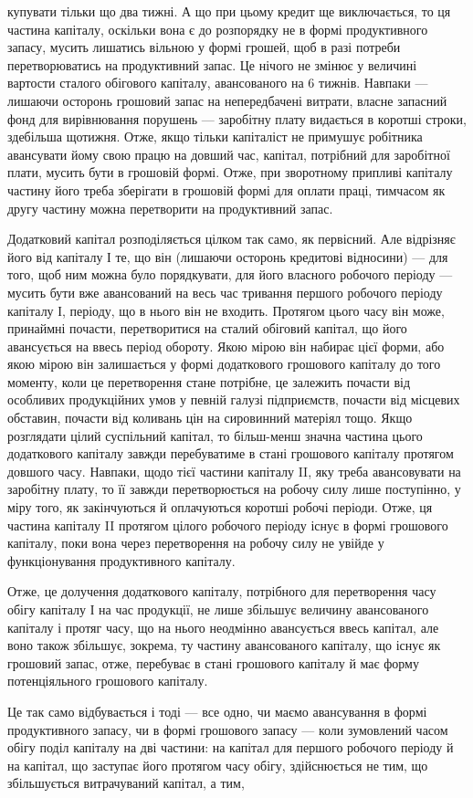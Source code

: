 \parcont{}  %
купувати тільки що два тижні. А що при цьому кредит ще виключається,
то ця частина капіталу, оскільки вона є до розпорядку не в формі продуктивного
запасу, мусить лишатись вільною у формі грошей, щоб в разі
потреби перетворюватись на продуктивний запас. Це нічого не змінює у
величині вартости сталого обігового капіталу, авансованого на 6 тижнів.
Навпаки — лишаючи осторонь грошовий запас на непередбачені витрати,
власне запасний фонд для вирівнювання порушень — заробітну плату видається
в коротші строки, здебільша щотижня. Отже, якщо тільки капіталіст
не примушує робітника авансувати йому свою працю на довший час,
капітал, потрібний для заробітної плати, мусить бути в грошовій формі.
Отже, при зворотному припливі капіталу частину його треба зберігати в
грошовій формі для оплати праці, тимчасом як другу частину можна перетворити
на продуктивний запас.

Додатковий капітал розподіляється цілком так само, як первісний.
Але відрізняє його від капіталу І те, що він (лишаючи осторонь кредитові
відносини) — для того, щоб ним можна було порядкувати, для його
власного робочого періоду — мусить бути вже авансований на весь
час тривання першого робочого періоду капіталу І, періоду, що в нього
він не входить. Протягом цього часу він може, принаймні почасти,
перетворитися на сталий обіговий капітал, що його авансується на ввесь
період обороту. Якою мірою він набирає цієї форми, або якою мірою
він залишається у формі додаткового грошового капіталу до того моменту,
коли це перетворення стане потрібне, це залежить почасти від
особливих продукційних умов у певній галузі підприємств, почасти від
місцевих обставин, почасти від коливань цін на сировинний матеріял тощо.
Якщо розглядати цілий суспільний капітал, то більш-менш значна частина
цього додаткового капіталу завжди перебуватиме в стані грошового
капіталу протягом довшого часу. Навпаки, щодо тієї частини капіталу II,
яку треба авансовувати на заробітну плату, то її завжди перетворюється
на робочу силу лише поступінно, у міру того, як закінчуються й оплачуються
коротші робочі періоди. Отже, ця частина капіталу II протягом
цілого робочого періоду існує в формі грошового капіталу, поки вона
через перетворення на робочу силу не увійде у функціонування продуктивного
капіталу.

Отже, це долучення додаткового капіталу, потрібного для перетворення
часу обігу капіталу І на час продукції, не лише збільшує величину
авансованого капіталу і протяг часу, що на нього неодмінно авансується
ввесь капітал, але воно також збільшує, зокрема, ту частину
авансованого капіталу, що існує як грошовий запас, отже, перебуває
в стані грошового капіталу й має форму потенціяльного грошового
капіталу.

Це так само відбувається і тоді — все одно, чи маємо авансування в
формі продуктивного запасу, чи в формі грошового запасу — коли зумовлений
часом обігу поділ капіталу на дві частини: на капітал для першого
робочого періоду й на капітал, що заступає його протягом часу
обігу, здійснюється не тим, що збільшується витрачуваний капітал, а тим,
\parbreak{}  %
